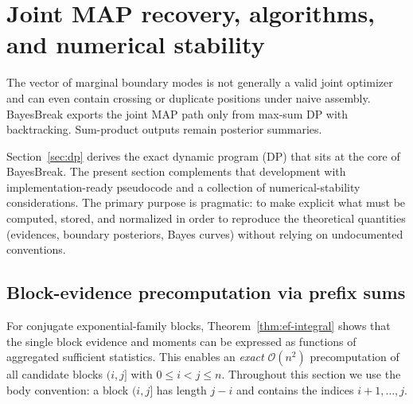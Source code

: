 \chapter{Joint MAP recovery, algorithms, and numerical stability}
\label{ch:map}
\label{app:max-sum-proof}
\label{app:complexity-proofs}

\begin{statusbox}
The vector of marginal boundary modes is not generally a valid joint optimizer and can even contain
crossing or duplicate positions under naive assembly. BayesBreak exports the joint MAP path only
from max-sum DP with backtracking. Sum-product outputs remain posterior summaries.
\end{statusbox}
\label{sec:algorithms}

Section~\ref{sec:dp} derives the exact dynamic program (DP) that sits at the core of BayesBreak.
The present section complements that development with implementation-ready pseudocode and a
collection of numerical-stability considerations.
The primary purpose is pragmatic: to make explicit what must be computed, stored, and
normalized in order to reproduce the theoretical quantities (evidences, boundary posteriors,
Bayes curves) without relying on undocumented conventions.

\section{Block-evidence precomputation via prefix sums}
\label{sec:alg-blocks}

For conjugate exponential-family blocks, Theorem~\ref{thm:ef-integral} shows that the single
block evidence and moments can be expressed as functions of aggregated sufficient statistics.
This enables an \emph{exact} $\mathcal{O}(n^2)$ precomputation of all candidate blocks $(i,j]$
with $0\le i<j\le n$. Throughout this section we use the body convention: a block $(i,j]$ has
length $j-i$ and contains the indices $i+1,\dots,j$.

